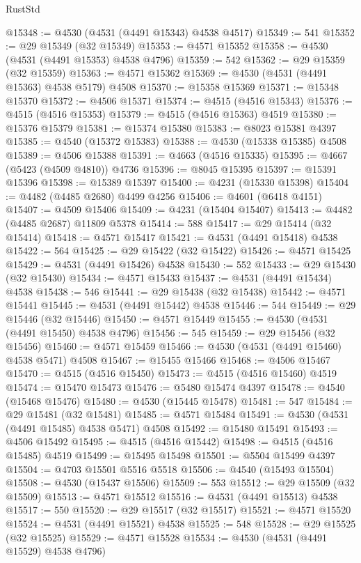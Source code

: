 \begin{lexlean}{RustStd}
\begin{coremodule}
@15348 := @4530 (@4531 (@4491 @15343) @4538 @4517)
@15349 := 541
@15352 := @29 @15349 (@32 @15349)
@15353 := @4571 @15352
@15358 := @4530 (@4531 (@4491 @15353) @4538 @4796)
@15359 := 542
@15362 := @29 @15359 (@32 @15359)
@15363 := @4571 @15362
@15369 := @4530 (@4531 (@4491 @15363) @4538 @5179) @4508
@15370 := @15358 @15369
@15371 := @15348 @15370
@15372 := @4506 @15371
@15374 := @4515 (@4516 @15343)
@15376 := @4515 (@4516 @15353)
@15379 := @4515 (@4516 @15363) @4519
@15380 := @15376 @15379
@15381 := @15374 @15380
@15383 := @8023 @15381 @4397
@15385 := @4540 (@15372 @15383)
@15388 := @4530 (@15338 @15385) @4508
@15389 := @4506 @15388
@15391 := @4663 (@4516 @15335)
@15395 := @4667 (@5423 (@4509 @4810)) @4736
@15396 := @8045 @15395
@15397 := @15391 @15396
@15398 := @15389 @15397
@15400 := @4231 (@15330 @15398)
@15404 := @4482 (@4485 @2680) @4499 @4256
@15406 := @4601 (@6418 @4151)
@15407 := @4509 @15406
@15409 := @4231 (@15404 @15407)
@15413 := @4482 (@4485 @2687) @11809 @5378
@15414 := 588
@15417 := @29 @15414 (@32 @15414)
@15418 := @4571 @15417
@15421 := @4531 (@4491 @15418) @4538
@15422 := 564
@15425 := @29 @15422 (@32 @15422)
@15426 := @4571 @15425
@15429 := @4531 (@4491 @15426) @4538
@15430 := 552
@15433 := @29 @15430 (@32 @15430)
@15434 := @4571 @15433
@15437 := @4531 (@4491 @15434) @4538
@15438 := 546
@15441 := @29 @15438 (@32 @15438)
@15442 := @4571 @15441
@15445 := @4531 (@4491 @15442) @4538
@15446 := 544
@15449 := @29 @15446 (@32 @15446)
@15450 := @4571 @15449
@15455 := @4530 (@4531 (@4491 @15450) @4538 @4796)
@15456 := 545
@15459 := @29 @15456 (@32 @15456)
@15460 := @4571 @15459
@15466 := @4530 (@4531 (@4491 @15460) @4538 @5471) @4508
@15467 := @15455 @15466
@15468 := @4506 @15467
@15470 := @4515 (@4516 @15450)
@15473 := @4515 (@4516 @15460) @4519
@15474 := @15470 @15473
@15476 := @5480 @15474 @4397
@15478 := @4540 (@15468 @15476)
@15480 := @4530 (@15445 @15478)
@15481 := 547
@15484 := @29 @15481 (@32 @15481)
@15485 := @4571 @15484
@15491 := @4530 (@4531 (@4491 @15485) @4538 @5471) @4508
@15492 := @15480 @15491
@15493 := @4506 @15492
@15495 := @4515 (@4516 @15442)
@15498 := @4515 (@4516 @15485) @4519
@15499 := @15495 @15498
@15501 := @5504 @15499 @4397
@15504 := @4703 @15501 @5516 @5518
@15506 := @4540 (@15493 @15504)
@15508 := @4530 (@15437 @15506)
@15509 := 553
@15512 := @29 @15509 (@32 @15509)
@15513 := @4571 @15512
@15516 := @4531 (@4491 @15513) @4538
@15517 := 550
@15520 := @29 @15517 (@32 @15517)
@15521 := @4571 @15520
@15524 := @4531 (@4491 @15521) @4538
@15525 := 548
@15528 := @29 @15525 (@32 @15525)
@15529 := @4571 @15528
@15534 := @4530 (@4531 (@4491 @15529) @4538 @4796)

\end{coremodule}
\end{lexlean}
